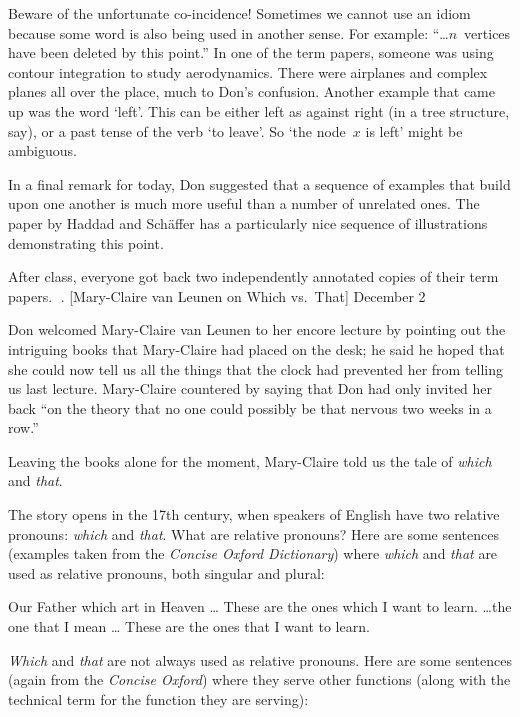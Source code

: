 Beware of the unfortunate co-incidence!  Sometimes we cannot use an
idiom because some word is also being used in another sense. For
example: ``\dots $n$~vertices have been deleted by this point.'' In one
of the term papers, someone was using contour integration to study
aerodynamics. There were airplanes and complex planes all over the place,
 much to Don's
confusion. Another example that came up was the word `left'. This can
be either left as against right (in a tree structure, say), or a past
tense of the verb `to leave'. So `the node~$x$ is left' might be
ambiguous.

In a final remark for today, Don suggested that a sequence of examples
that build upon one another is much more useful than a number of
unrelated ones.
The paper by Haddad and Sch\"affer has a particularly nice sequence of
illustrations demonstrating this point.

After class, everyone got back two independently
annotated copies of their term papers.
. [Mary-Claire van Leunen on Which vs.\ That] \tll December 2

Don welcomed Mary-Claire van Leunen to her encore lecture by pointing out
the intriguing books that Mary-Claire had placed on the desk; he said
he hoped that she could now tell us all the things that the clock had
prevented her from telling us last lecture.  Mary-Claire countered by
saying that Don had only invited her back ``on the theory that no one could
possibly be that nervous two weeks in a row.''

Leaving the books alone for the moment, Mary-Claire told us the tale of
{\it which\/} and {\it that}.

The story opens in the 17th century, when speakers of English have two
relative pronouns: {\it which\/} and {\it that}.  
What are relative pronouns?  Here are
some sentences (examples taken from the {\sl Concise Oxford Dictionary\/}) 
where
{\it which\/} and {\it that\/} are used as relative pronouns, both singular
and plural:

\smallskip
{\obeylines\parskip=0pt
\qquad\qquad\qquad Our Father which art in Heaven \dots
\qquad\qquad\qquad These are the ones which I want to learn.
\medskip
\qquad\qquad\qquad \dots the one that I mean \dots
\qquad\qquad\qquad These are the ones that I want to learn.
}

\goodbreak
\smallskip
{\it Which\/} and {\it that\/} 
are not always used as relative pronouns.  Here are some
sentences (again from the {\sl Concise Oxford\/}) where they serve
other functions (along with the technical term for the function 
they are serving):

